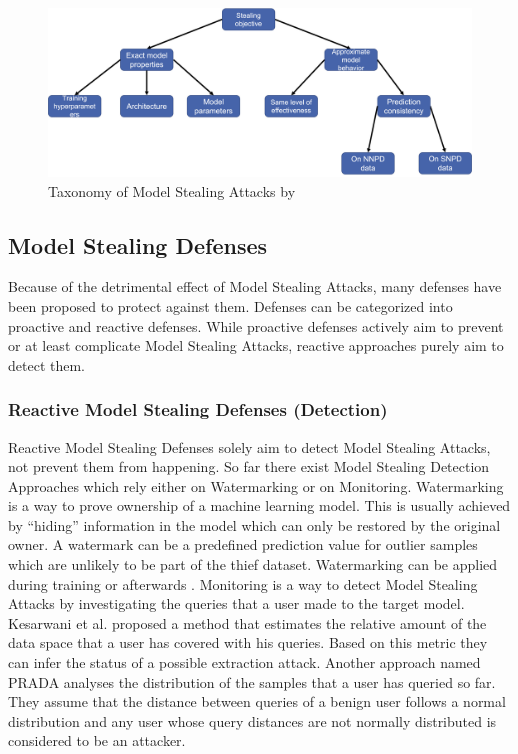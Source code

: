 \begin{figure} [ht]
  \centering
  \includegraphics[width=.9\linewidth]{images/MS_Taxonomy.png}
  \caption[Model Stealing Taxonomy]{Taxonomy of Model Stealing Attacks by \cite{oliynyk2022know}}
  \label{fig:ModelStealing:Taxonomy}
\end{figure}


\subsection{Model Stealing Defenses}
\label{sec:ModelStealing:Defenses}
Because of the detrimental effect of Model Stealing Attacks, many defenses have been proposed to protect against them. Defenses can be categorized into proactive and
reactive defenses. While proactive defenses actively aim to prevent or at least complicate Model Stealing Attacks, reactive approaches purely aim to detect them.

\subsubsection{Reactive Model Stealing Defenses (Detection)}
\label{sec:ModelStealing:Defenses:Detection}
Reactive Model Stealing Defenses solely aim to detect Model Stealing Attacks, not prevent them from happening. So far there exist Model Stealing Detection Approaches which
rely either on Watermarking or on Monitoring. Watermarking is a way to prove ownership of a machine learning model. This is usually achieved by \enquote{hiding} information
in the model which can only be restored by the original owner. A watermark can be a predefined prediction value for outlier samples which are unlikely to be part of the thief
dataset. Watermarking can be applied during training \cite{zhang2018protecting} or afterwards \cite{szyller2021dawn}. Monitoring is a way to detect Model Stealing Attacks by
investigating the queries that a user made to the target model. Kesarwani et al. \cite{kesarwani2018model} proposed a method that estimates the relative amount of the data space that a user has
covered with his queries. Based on this metric they can infer the status of a possible extraction attack. Another approach named PRADA \cite{juuti2019prada} analyses the distribution of the
samples that a user has queried so far. They assume that the distance between queries of a benign user follows a normal distribution and any user whose query distances are not normally
distributed is considered to be an attacker. \par

